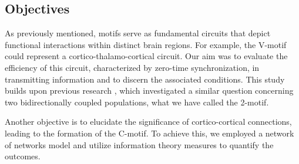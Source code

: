 \documentclass[../main.tex]{subfiles}
\begin{document}
\subsection{Objectives}
As previously mentioned, motifs serve as fundamental circuits that depict functional interactions within distinct brain regions.
For example, the V-motif could represent a cortico-thalamo-cortical circuit.
Our aim was to evaluate the efficiency of this circuit, characterized by zero-time synchronization, in transmitting information and to discern the associated conditions.
This study builds upon previous research \citep{pariz_transmission_2021}, which investigated a similar question concerning two bidirectionally coupled populations, what we have called the 2-motif.

Another objective is to elucidate the significance of cortico-cortical connections, leading to the formation of the C-motif.
To achieve this, we employed a network of networks model and utilize information theory measures to quantify the outcomes.
\end{document}
